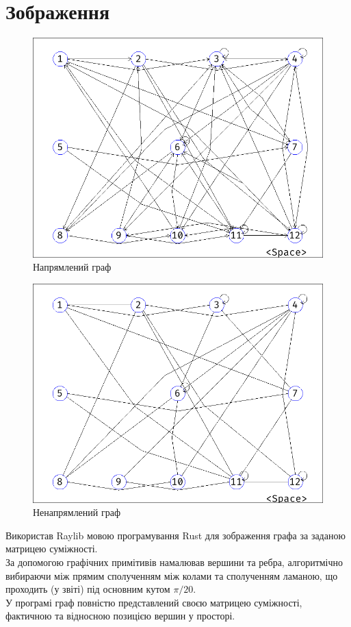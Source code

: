 \pagebreak
\section{Зображення}

\begin{figure}[h!]
  \center\includegraphics[width=0.5\linewidth]{directed.png}
  \caption{Напрямлений граф}
\end{figure}
\begin{figure}[ht!]
  \center\includegraphics[width=0.5\linewidth]{undirected.png}
  \caption{Ненапрямлений граф}
\end{figure}

\conclusion%
Використав Raylib мовою програмування Rust для зображення графа за заданою матрицею суміжності.\\
За допомогою графічних примітивів намалював вершини та ребра, алгоритмічно вибираючи між прямим сполученням між колами та сполученням ламаною, що проходить (у звіті) під основним кутом $\pi/20$.\\
У програмі граф повністю представлений своєю матрицею суміжності, фактичною та відносною позицією вершин у просторі.



